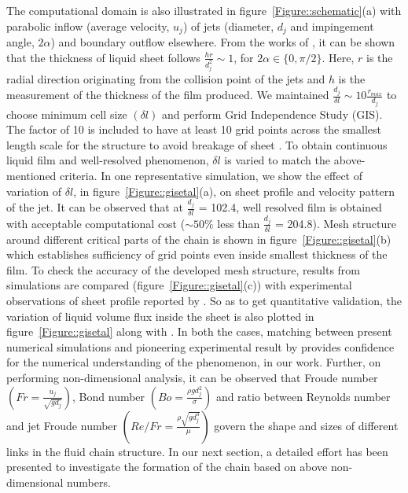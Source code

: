 \documentclass{jfm}
\begin{document}
The computational domain is also illustrated in figure~\ref{Figure::schematic}(a) with parabolic inflow (average velocity, $u_j$) of jets (diameter, $d_j$ and impingement angle, $2\alpha$) and boundary outflow elsewhere. From the works of \cite{choo2001parametric}, it can be shown that the thickness of liquid sheet follows $\frac{hr}{d_j^2} \sim 1$, for $2\alpha \in \{0,\pi/2\}$.  Here, $r$ is the radial direction originating from the collision point of the jets and $h$ is the measurement of the thickness of the film produced. We maintained $\frac{d_j}{\delta l} \sim 10\frac{r_{max}}{d_j}$ to choose minimum cell size $\left(\delta l\right)$ and perform Grid Independence Study (GIS). The factor of 10 is included to have at least 10 grid points\citep{ling2015multiscale} across the smallest length scale for the structure to avoid breakage of sheet \citep{chen2013high}. To obtain continuous liquid film and well-resolved phenomenon, $\delta l$ is varied to match the above-mentioned criteria. In one representative simulation, we show the effect of variation of $\delta l$, in figure~\ref{Figure::gisetal}(a), on sheet profile and velocity pattern of the jet. It can be observed that at $\frac{d_j}{\delta l}$ = 102.4, well resolved film is obtained with acceptable computational cost ($\sim 50\%$ less than $\frac{d_j}{\delta l}$ = 204.8). Mesh structure around different critical parts of the chain is shown in figure~\ref{Figure::gisetal}(b) which establishes sufficiency of grid points even inside smallest thickness of the film. To check the accuracy of the developed mesh structure, results from simulations are compared (figure~\ref{Figure::gisetal}(c)) with experimental observations of sheet profile reported by \cite{bush2004collision}. So as to get quantitative validation, the variation of liquid volume flux inside the sheet is also plotted in figure~\ref{Figure::gisetal} along with \cite{bush2004collision}. In both the cases, matching between present numerical simulations and pioneering experimental result by \cite{bush2004collision} provides confidence for the numerical understanding of the phenomenon, in our work. Further, on performing non-dimensional analysis, it can be observed that Froude number $\left(Fr = \frac{u_j}{\sqrt{gd_j}}\right)$, Bond number $\left(Bo = \frac{\rho gd_j^2}{\sigma}\right)$ and ratio between Reynolds number and jet Froude number $\left(Re/Fr = \frac{\rho\sqrt{gd_j^3}}{\mu}\right)$ govern the shape and sizes of different links in the fluid chain structure. In our next section, a detailed effort has been presented to investigate the formation of the chain based on above non-dimensional numbers.
\end{document}
